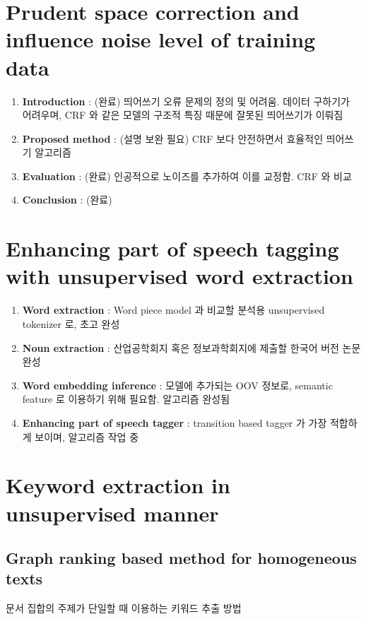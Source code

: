 \documentclass[11pt]{article}
\begin{document}
\section{Prudent space correction and influence noise level of training data}

\begin{enumerate}[noitemsep]
    \item \textbf{Introduction} : (완료) 띄어쓰기 오류 문제의 정의 및 어려움. 데이터 구하기가 어려우며, CRF 와 같은 모델의 구조적 특징 때문에 잘못된 띄어쓰기가 이뤄짐
    \item \textbf{Proposed method} : (설명 보완 필요) CRF 보다 안전하면서 효율적인 띄어쓰기 알고리즘
    \item \textbf{Evaluation} : (완료) 인공적으로 노이즈를 추가하여 이를 교정함. CRF 와 비교
    \item \textbf{Conclusion} : (완료)
\end{enumerate}

\section{Enhancing part of speech tagging with unsupervised word extraction}

\begin{enumerate}[noitemsep]
    \item \textbf{Word extraction} : Word piece model 과 비교할 분석용 unsupervised tokenizer 로, 초고 완성
    \item \textbf{Noun extraction} : 산업공학회지 혹은 정보과학회지에 제출할 한국어 버전 논문 완성
    \item \textbf{Word embedding inference} : 모델에 추가되는 OOV 정보로, semantic feature 로 이용하기 위해 필요함. 알고리즘 완성됨
    \item \textbf{Enhancing part of speech tagger} : transition based tagger 가 가장 적합하게 보이며, 알고리즘 작업 중
\end{enumerate}

\section{Keyword extraction in unsupervised manner}
\subsection{Graph ranking based method for homogeneous texts}

문서 집합의 주제가 단일할 때 이용하는 키워드 추출 방법
\end{document}
